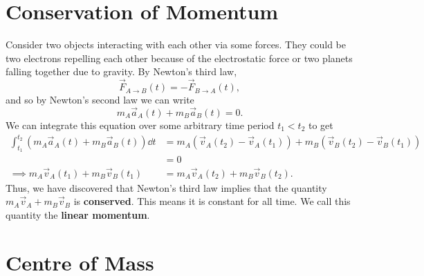 \documentclass[../classical_mechanics.tex]{subfiles}
\begin{document}
    \section{Conservation of Momentum}\label{sec:conservation-of-momentum}
        Consider two objects interacting with each other via some forces.
        They could be two electrons repelling each other because of the electrostatic force or two planets falling together due to gravity.
        By Newton's third law,
        \begin{equation}
            \vec{F}_{A\to B}(t)=-\vec{F}_{B\to A}(t),
        \end{equation}
        and so by Newton's second law we can write
        \begin{equation}\label{eq-COM-acc}
            m_A\vec{a}_A(t)+m_B\vec{a}_B(t)=0.
        \end{equation}
        We can integrate this equation over some arbitrary time period $t_1<t_2$ to get
        \begin{align}
            \int_{t_1}^{t_2}\left(m_A\vec{a}_A(t)+m_B\vec{a}_B(t)\right)\dd{t}&=m_A\left(\vec{v}_A(t_2)-\vec{v}_A(t_1)\right)+m_B\left(\vec{v}_B(t_2)-\vec{v}_B(t_1)\right)\\
            &=0\\
            \implies m_A\vec{v}_A(t_1)+m_B\vec{v}_B(t_1)&=m_A\vec{v}_A(t_2)+m_B\vec{v}_B(t_2).
        \end{align}
        Thus, we have discovered that Newton's third law implies that the quantity $m_A\vec{v}_A+m_B\vec{v}_B$ is \textbf{conserved}.
        This means it is constant for all time. We call this quantity the \textbf{linear momentum}.

    \section{Centre of Mass}\label{sec:centre-of-mass}
\end{document}
